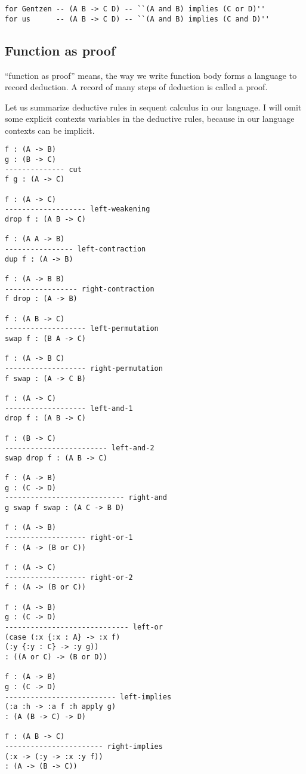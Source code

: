 \documentclass[numbers]{sigplanconf}
\begin{document}
{\scriptsize\begin{verbatim}
for Gentzen -- (A B -> C D) -- ``(A and B) implies (C or D)''
for us      -- (A B -> C D) -- ``(A and B) implies (C and D)''
\end{verbatim}}

\newpage

\subsection{Function as proof}

``function as proof'' means,
the way we write function body forms a language to record deduction.
A record of many steps of deduction is called a proof.

Let us summarize deductive rules in sequent calculus in our language.
I will omit some explicit contexts variables in the deductive rules,
because in our language contexts can be implicit.

{\scriptsize\begin{verbatim}
f : (A -> B)
g : (B -> C)
-------------- cut
f g : (A -> C)

f : (A -> C)
------------------- left-weakening
drop f : (A B -> C)

f : (A A -> B)
---------------- left-contraction
dup f : (A -> B)

f : (A -> B B)
----------------- right-contraction
f drop : (A -> B)

f : (A B -> C)
------------------- left-permutation
swap f : (B A -> C)

f : (A -> B C)
------------------- right-permutation
f swap : (A -> C B)

f : (A -> C)
------------------- left-and-1
drop f : (A B -> C)

f : (B -> C)
------------------------ left-and-2
swap drop f : (A B -> C)

f : (A -> B)
g : (C -> D)
---------------------------- right-and
g swap f swap : (A C -> B D)

f : (A -> B)
------------------- right-or-1
f : (A -> (B or C))

f : (A -> C)
------------------- right-or-2
f : (A -> (B or C))

f : (A -> B)
g : (C -> D)
----------------------------- left-or
(case (:x {:x : A} -> :x f)
(:y {:y : C} -> :y g))
: ((A or C) -> (B or D))

f : (A -> B)
g : (C -> D)
-------------------------- left-implies
(:a :h -> :a f :h apply g)
: (A (B -> C) -> D)

f : (A B -> C)
----------------------- right-implies
(:x -> (:y -> :x :y f))
: (A -> (B -> C))
\end{verbatim}}
\end{document}
